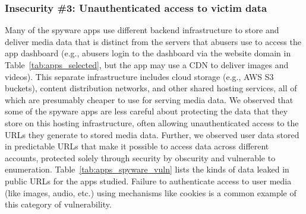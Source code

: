 \documentclass[sigconf,balance=false]{acmart}
\newcommand{\sumanth}[1]{\textcolor{violet}{\noindent[SR: #1]}}
\newcommand{\geoff}[1]{\textcolor{purple}{\noindent[GV: #1]}}
\newcommand{\sumanth}[1]{}
\newcommand{\geoff}[1]{}
\begin{document}
\subsubsection*{Insecurity \#3: Unauthenticated access to victim data}
\label{sec:leaky-urls}


Many of the spyware apps use different backend infrastructure to store
and deliver media data that is distinct from the servers that
abusers use to access the app dashboard (e.g., abusers login
to the dashboard via the website domain in Table~\ref{tab:apps_selected}, but
the app may use a CDN to deliver images and videos).
This separate infrastructure
includes cloud storage (e.g., AWS S3 buckets), content distribution
networks, and other shared hosting services, all of which are
presumably cheaper to use for serving media data.  We observed that
some of the spyware apps are less careful about protecting the
data that they store on this hosting infrastructure, often allowing
unauthenticated access to the URLs they generate to stored media data.
Further, we observed user data stored in predictable URLs that make it
possible to access data across different accounts, protected solely
through security by obscurity and vulnerable to enumeration. Table~\ref{tab:apps_spyware_vuln} lists
the kinds of data leaked in public URLs for the apps studied. Failure
to authenticate access to user media (like images, audio, etc.) using
mechanisms like cookies is a common example of this category of
vulnerability.
\end{document}
